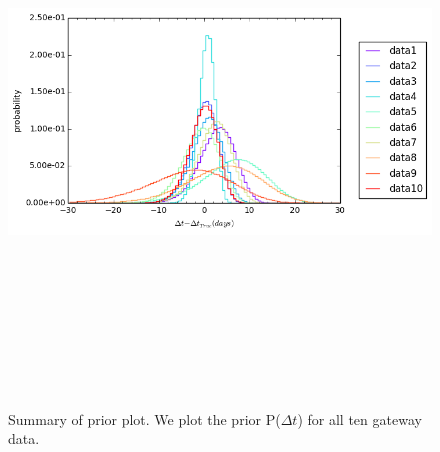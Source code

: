 \documentclass[\docopts]{\docclass}
\begin{document}
\begin{figure}[!h]
\includegraphics[width=\textwidth, height=15cm, keepaspectratio]{summary_prior_summary.png}
\caption{Summary of prior plot. We plot the prior P($\Delta t$) for all ten gateway data.}
\label{fig:summary_prior}
\end{figure}
\end{document}
